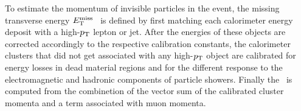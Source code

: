 To estimate the momentum of invisible particles in the event,
the missing transverse energy $\met$~\cite{met} is defined by first matching each calorimeter energy 
deposit with a high-$\pt$ lepton or jet. After the energies of these objects are
corrected accordingly to the respective calibration constants, the calorimeter clusters
that did not get associated with any  high-$\pt$ object are calibrated for energy losses in 
dead material regions and for the different response to the electromagnetic and hadronic
components of particle showers. Finally the \met\ is computed from the combinetion of the vector 
sum of the calibrated cluster momenta and a term associated with muon momenta.
